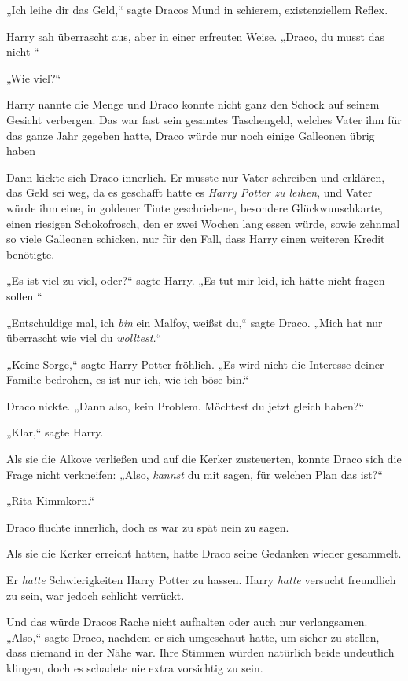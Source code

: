 {„Ich leihe dir das Geld,“ sagte Dracos Mund in schierem, existenziellem Reflex.

Harry sah überrascht aus, aber in einer erfreuten Weise. „Draco, du musst das nicht \later“

„Wie viel?“

Harry nannte die Menge und Draco konnte nicht ganz den Schock auf seinem Gesicht verbergen. Das war fast sein gesamtes Taschengeld, welches Vater ihm für das ganze Jahr gegeben hatte, Draco würde nur noch einige Galleonen übrig haben \later

Dann kickte sich Draco innerlich. Er musste nur Vater schreiben und erklären, das Geld sei weg, da es geschafft hatte es \emph{Harry Potter zu leihen}, und Vater würde ihm eine, in goldener Tinte geschriebene, besondere Glückwunschkarte, einen riesigen Schokofrosch, den er zwei Wochen lang essen würde, sowie zehnmal so viele Galleonen schicken, nur für den Fall, dass Harry einen weiteren Kredit benötigte.

„Es ist viel zu viel, oder?“ sagte Harry. „Es tut mir leid, ich hätte nicht fragen sollen \later“

„Entschuldige mal, ich \emph{bin} ein Malfoy, weißst du,“ sagte Draco. „Mich hat nur überrascht wie viel du \emph{wolltest.}“

\emph{„}Keine Sorge,“ sagte Harry Potter fröhlich. „Es wird nicht die Interesse deiner Familie bedrohen, es ist nur ich, wie ich böse bin.“

Draco nickte. „Dann also, kein Problem. Möchtest du jetzt gleich haben?“

„Klar,“ sagte Harry.

Als sie die Alkove verließen und auf die Kerker zusteuerten, konnte Draco sich die Frage nicht verkneifen: „Also, \emph{kannst} du mit sagen, für welchen Plan das ist?“

„Rita Kimmkorn.“

Draco fluchte innerlich, doch es war zu spät nein zu sagen.

Als sie die Kerker erreicht hatten, hatte Draco seine Gedanken wieder gesammelt.

Er \emph{hatte} Schwierigkeiten Harry Potter zu hassen. Harry \emph{hatte} versucht freundlich zu sein, war jedoch schlicht verrückt.

Und das würde Dracos Rache nicht aufhalten oder auch nur verlangsamen. „Also,“ sagte Draco, nachdem er sich umgeschaut hatte, um sicher zu stellen, dass niemand in der Nähe war. Ihre Stimmen würden natürlich beide undeutlich klingen, doch es schadete nie extra vorsichtig zu sein.

}
